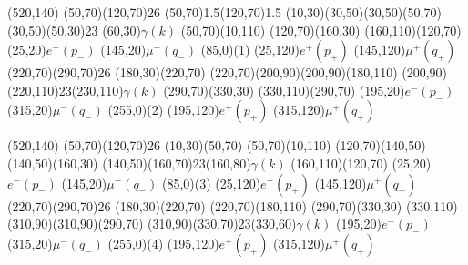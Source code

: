 \begin{axopicture}(520,140)
	\Photon(50,70)(120,70){2}{6}
	\Vertex(50,70){1.5}\Vertex(120,70){1.5}
	\Line[arrow](10,30)(30,50)\Line[arrow](30,50)(50,70)
	\Photon(30,50)(50,30){2}{3} \Text(60,30){$\gamma(k)$}
	\Line[arrow](50,70)(10,110)
	\Line[arrow](120,70)(160,30)
	\Line[arrow](160,110)(120,70)
	\Text(25,20){$e^-(p_-)$}
	\Text(145,20){$\mu^-(q_-)$}
	\Text(85,0){(1)}
	\Text(25,120){$e^+(p_+)$}
	\Text(145,120){$\mu^+(q_+)$}
	\Photon(220,70)(290,70){2}{6}
	\Line[arrow](180,30)(220,70)
	\Line[arrow](220,70)(200,90)\Line[arrow](200,90)(180,110)
	\Photon(200,90)(220,110){2}{3}\Text(230,110){$\gamma(k)$}
	\Line[arrow](290,70)(330,30)
	\Line[arrow](330,110)(290,70)
	\Text(195,20){$e^-(p_-)$}
	\Text(315,20){$\mu^-(q_-)$}
	\Text(255,0){(2)}
	\Text(195,120){$e^+(p_+)$}
	\Text(315,120){$\mu^+(q_+)$}
\end{axopicture}

\begin{axopicture}(520,140)
	\Photon(50,70)(120,70){2}{6}
	\Line[arrow](10,30)(50,70)
	\Line[arrow](50,70)(10,110)
	\Line[arrow](120,70)(140,50)\Line[arrow](140,50)(160,30)
	\Photon(140,50)(160,70){2}{3}\Text(160,80){$\gamma(k)$}
	\Line[arrow](160,110)(120,70)
	\Text(25,20){$e^-(p_-)$}
	\Text(145,20){$\mu^-(q_-)$}
	\Text(85,0){(3)}
	\Text(25,120){$e^+(p_+)$}
	\Text(145,120){$\mu^+(q_+)$}
	\Photon(220,70)(290,70){2}{6}
	\Line[arrow](180,30)(220,70)
	\Line[arrow](220,70)(180,110)
	\Line[arrow](290,70)(330,30)
	\Line[arrow](330,110)(310,90)\Line[arrow](310,90)(290,70)
	\Photon(310,90)(330,70){2}{3}\Text(330,60){$\gamma(k)$}
	\Text(195,20){$e^-(p_-)$}
	\Text(315,20){$\mu^-(q_-)$}
	\Text(255,0){(4)}
	\Text(195,120){$e^+(p_+)$}
	\Text(315,120){$\mu^+(q_+)$}
\end{axopicture}

